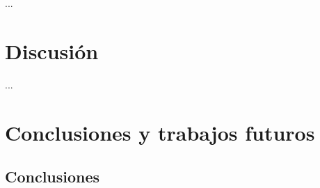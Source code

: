 \documentclass[IB,BIB]{TFUOC}%
\begin{document}


% 

...




\chapter{Discusión}
\label{chap:Discusión}


...




\chapter{Conclusiones y trabajos futuros}
\label{chap:Conclusiones y trabajos futuros}

\section{Conclusiones}
\label{sec:Conclusiones}
\end{document}
